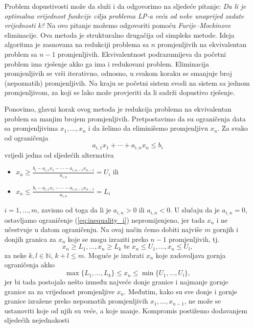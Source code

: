 \documentclass[a4paper, utf8, 11pt, colorlinks]{book}
\theoremstyle{definition}
\begin{document}
Problem dopustivosti može da služi i da odgovorimo na sljedeće pitanje: 
\emph{Da li je optimalna vrijednost funkcije cilja problema LP-a veća od neke unaprijed zadate  vrijednosti k?}
 Na ovo pitanje možemo odgovoriti pomoću  \emph{Furije–Mockinove} eliminacije. Ova metoda je strukturalno drugačija  od simpleks metode. Ideja algoritma je zasnovana na redukciji problema sa $n$ promjenljivih na ekvivalentan problem sa $n-1$ promjenljivih. Ekvivalentnost podrazumijeva da početni problem ima rješenje akko  ga ima i redukovani problem. Eliminacija promjenljivih se vrši iterativno, odnosno, u svakom koraku se smanjuje broj (nepoznatih)  promjenljivih. Na kraju se početni sistem svodi na sistem sa jednom promjenljivom, za koji se lako može provjeriti da li sadrži dopustivo rješenje.
 
 Ponovimo, glavni korak ovog metoda je redukcija problema na ekvivalentan problem sa manjim brojem promjenljivih. Pretpostavimo da su ograničenja data sa promjenljivima $x_1,\ldots, x_n$ i da želimo da eliminišemo promjenljivu $x_n$. Za svako od ograničenja
 \begin{equation}\label{eq:inequality_i}
      a_{i,1} x_1 + \cdots + a_{i,n} x_n \leq b_i
 \end{equation}
 vrijedi jedna od sljedećih alternativa 
 \begin{itemize}
 	 \item  $x_n \geq \frac{b_i - a_{i,1}x_1- \cdots - a_{i, n-1} x_{n-1} }{a_{i,n}}=U_i$ ili 
 	 \item   $x_n \leq \frac{b_i - a_{i,1}x_1- \cdots - a_{i, n-1} x_{n-1} }{a_{i,n}}=L_i$
 \end{itemize}
 $i=1,\ldots, m$, zavisno od toga da li je $a_{i,n} >0$ ili $a_{i,n} <0$. U slučaju da je $a_{i,n} = 0$,  ostavljamo  ograničenje (\ref{eq:inequality_i}) nepromijenjeno, jer tada $x_n$ i ne učestvuje u datom ograničenju. Na ovaj način ćemo dobiti najviše $m$ gornjih i donjih granica za $x_n$ koje se mogu izraziti preko $n-1$ promjenljivih, tj. 
 $$  x_n \geq L_1, \ldots, x_n\geq L_k \mbox{ te }  x_n \leq U_1, \ldots, x_n \leq U_l,$$
  za neke $k,l \in \mathbb{N}$, $k+l \leq m$.
 Moguće je izabrati $x_n$ koje zadovoljava gornja ograničenja akko 
 \begin{equation}\label{eq:min_max_xi}
     \max\{L_1,\ldots, L_k \} \leq x_n \leq \min \{ U_1, \ldots, U_l \},
   \end{equation}
 jer bi tada postojalo nešto između najveće donje granice i najmanje gornje granice za za vrijednost promjenljive $x_n$. Međutim, kako su sve donje i gornje granice izražene preko nepoznatih promjenljivih $x_1, \ldots, x_{n-1}$, ne može se ustanoviti koje od njih su veće, a koje manje. Kompromis postižemo dodavanjem  sljedećih nejednakosti 
\end{document}
